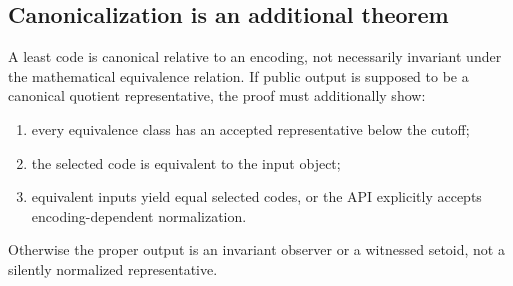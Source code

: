 \subsection{Canonicalization is an additional theorem}

A least code is canonical relative to an encoding, not necessarily invariant
under the mathematical equivalence relation.  If public output is supposed to
be a canonical quotient representative, the proof must additionally show:
\begin{enumerate}[label=(\roman*)]
\item every equivalence class has an accepted representative below the cutoff;
\item the selected code is equivalent to the input object;
\item equivalent inputs yield equal selected codes, or the API explicitly
      accepts encoding-dependent normalization.
\end{enumerate}
Otherwise the proper output is an invariant observer or a witnessed setoid,
not a silently normalized representative.
